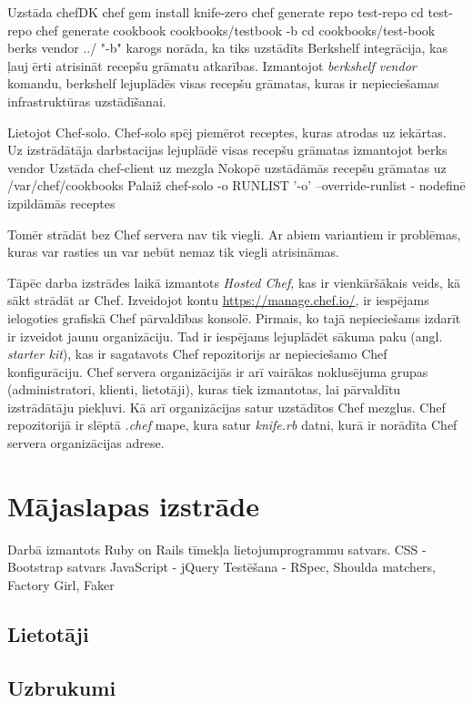 Uzstāda chefDK
chef gem install knife-zero
chef generate repo test-repo
cd test-repo
chef generate cookbook cookbooks/testbook -b
cd cookbooks/test-book
berks vendor ../
"-b"  karogs norāda, ka tiks uzstādīts Berkshelf integrācija, kas ļauj ērti atrisināt recepšu grāmatu atkarības.
Izmantojot \textit{berkshelf vendor} komandu, berkshelf lejuplādēs visas recepšu grāmatas, kuras ir nepieciešamas infrastruktūras uzstādīšanai.

Lietojot Chef-solo.
Chef-solo spēj piemērot receptes, kuras atrodas uz iekārtas.
Uz izstrādātāja darbstacijas lejuplādē visas recepšu grāmatas izmantojot berks vendor
Uzstāda chef-client uz mezgla
Nokopē uzstādāmās recepšu grāmatas uz /var/chef/cookbooks
Palaiž chef-solo -o RUNLIST
'-o' --override-runlist	- nodefinē izpildāmās receptes

Tomēr strādāt bez Chef servera nav tik viegli. Ar abiem variantiem ir problēmas, kuras var rasties un var nebūt nemaz tik viegli atrisināmas.

Tāpēc darba izstrādes laikā izmantots \textit{Hosted Chef}, kas ir vienkāršākais veids, kā sākt strādāt ar Chef.
Izveidojot kontu \url{https://manage.chef.io/}, ir iespējams ielogoties grafiskā Chef pārvaldības konsolē.
Pirmais, ko tajā nepieciešams izdarīt ir izveidot jaunu organizāciju. Tad ir iespējams lejuplādēt sākuma paku (angl. \textit{starter kit}), kas ir sagatavots Chef repozitorijs ar nepieciešamo Chef konfigurāciju. Chef servera organizācijās ir arī vairākas noklusējuma grupas (administratori, klienti, lietotāji), kuras tiek izmantotas, lai pārvaldītu izstrādātāju piekļuvi. Kā arī organizācijas satur uzstādītos Chef mezglus. Chef repozitorijā ir slēptā \textit{.chef} mape, kura satur \textit{knife.rb} datni, kurā ir norādīta Chef servera organizācijas adrese.

\section{Mājaslapas izstrāde}
Darbā izmantots Ruby on Rails  tīmekļa lietojumprogrammu satvars.
CSS - Bootstrap satvars
JavaScript - jQuery
Testēšana - RSpec, Shoulda matchers, Factory Girl, Faker


\subsection{Lietotāji}
\subsection{Uzbrukumi}